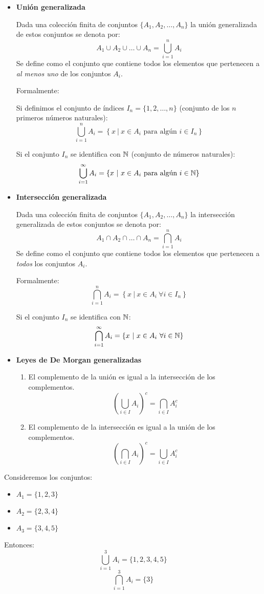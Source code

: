 \begin{itemize}
	\item \textbf{Unión generalizada}
	
	Dada una colección finita de conjuntos \( \{ A_1, A_2, \dots, A_n \} \) la unión generalizada de estos conjuntos se denota por:
	\[ A_1 \cup A_2 \cup \dots \cup A_n = \bigcup_{i=1}^n A_i  \]
	Se define como el conjunto que contiene todos los elementos que pertenecen a \textit{al menos uno} de los conjuntos \(A_i\).
	
	Formalmente:
	
	Si definimos el conjunto de índices \( I_n = \{ 1, 2, \dots, n \} \) (conjunto de los $n$ primeros números naturales):
	\[ \bigcup_{i=1}^n A_i = \left\{ x \ | \ x \in A_i \mbox{ para algún } i \in I_n \right\} \]
	
	Si el conjunto $I_n$ se identifica con $\mathbb{N}$ (conjunto de números naturales):
	\[ \bigcup_{i=1}^\infty A_i = \left\{ x \ | \ x \in A_i \mbox{ para algún } i \in \mathbb{N} \right\} \]
	
	\item \textbf{Intersección generalizada}
	
	Dada una colección finita de conjuntos \( \{ A_1, A_2, \dots, A_n \} \) la intersección generalizada de estos conjuntos se denota por:
	\[ A_1 \cap A_2 \cap \dots \cap A_n = \bigcap_{i=1}^n A_i  \]
	Se define como el conjunto que contiene todos los elementos que pertenecen a \textit{todos} los conjuntos \(A_i\).
	
	Formalmente:
	\[ \bigcap_{i=1}^n A_i = \left\{ x \ | \ x \in A_i \ \forall i \in I_n \right\} \]
	
	Si el conjunto $I_n$ se identifica con $\mathbb{N}$:
	\[ \bigcap_{i=1}^\infty A_i = \left\{ x \ | \ x \in A_i \ \forall i \in \mathbb{N} \right\} \]
	
	\item \textbf{Leyes de De Morgan generalizadas}
	
	\begin{enumerate}
		\item El complemento de la unión es igual a la intersección de los complementos. 
		\[ \left( \bigcup_{i \in I} A_i \right)^c = \bigcap_{i\in I} A_i^c \]
		\item El complemento de la intersección es igual a la unión de los complementos.
		\[ \left( \bigcap_{i \in I} A_i \right)^c = \bigcup_{i\in I} A_i^c \]
	\end{enumerate}
\end{itemize}

\begin{fmd-example}
	Consideremos los conjuntos:
	\begin{itemize}[itemsep=0pt]
		\item \(A_1 = \{1, 2, 3\}\)
		\item \(A_2 = \{2, 3, 4\}\)
		\item \(A_3 = \{3, 4, 5\}\)
	\end{itemize}
	Entonces:
	\[\bigcup_{i=1}^{3} A_i = \{1, 2, 3, 4, 5\}\]
	\[\bigcap_{i=1}^{3} A_i = \{3\}\]
\end{fmd-example}

